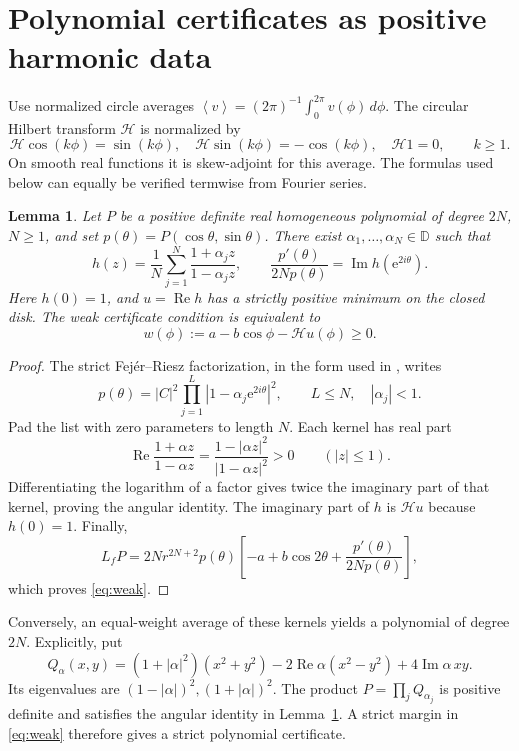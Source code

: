 \documentclass[11pt]{article}
\newtheorem{lemma}[theorem]{Lemma}
\theoremstyle{remark}\newtheorem{remark}[theorem]{Remark}
\newcommand{\D}{\mathbb D}
\newcommand{\Rea}{\operatorname{Re}}
\newcommand{\Ima}{\operatorname{Im}}
\newcommand{\avg}[1]{\left\langle #1\right\rangle}
\newcommand{\ee}{\mathrm e}
\begin{document}
\section{Polynomial certificates as positive harmonic data}
Use normalized circle averages
\(\avg v=(2\pi)^{-1}\int_0^{2\pi}v(\phi)\,d\phi\).
The circular Hilbert transform \(\mathcal H\) is normalized by
\[
 \mathcal H\cos(k\phi)=\sin(k\phi),\quad
 \mathcal H\sin(k\phi)=-\cos(k\phi),\quad
 \mathcal H1=0,\qquad k\ge1.
\]
On smooth real functions it is skew-adjoint for this average.
The formulas used below can equally be verified termwise from
Fourier series.

\begin{lemma}\label{lem:harmonic}
Let \(P\) be a positive definite real homogeneous polynomial of
degree \(2N\), \(N\ge1\), and set
\(p(\theta)=P(\cos\theta,\sin\theta)\).
There exist \(\alpha_1,\ldots,\alpha_N\in\D\) such that
\[
 h(z)=\frac1N\sum_{j=1}^N\frac{1+\alpha_jz}{1-\alpha_jz},
 \qquad
 \frac{p'(\theta)}{2Np(\theta)}
       =\Ima h(\ee^{2i\theta}).
\]
Here \(h(0)=1\), and \(u=\Rea h\) has a strictly positive minimum
on the closed disk. The weak certificate condition is equivalent to
\begin{equation}\label{eq:weak}
 w(\phi):=a-b\cos\phi-\mathcal Hu(\phi)\ge0.
\end{equation}
\end{lemma}
\begin{proof}
The strict Fej\'er--Riesz factorization, in the form used in
\cite[Lemmas III.2--III.3]{liu}, writes
\[
 p(\theta)=|C|^2\prod_{j=1}^L
        |1-\alpha_j\ee^{2i\theta}|^2,
 \qquad L\le N,\quad |\alpha_j|<1.
\]
Pad the list with zero parameters to length \(N\).
Each kernel has real part
\[
 \Rea\frac{1+\alpha z}{1-\alpha z}
       =\frac{1-|\alpha z|^2}{|1-\alpha z|^2}>0
       \qquad(|z|\le1).
\]
Differentiating the logarithm of a factor gives twice the imaginary
part of that kernel, proving the angular identity.
The imaginary part of \(h\) is \(\mathcal Hu\) because \(h(0)=1\).
Finally,
\[
 L_fP=2N r^{2N+2}p(\theta)
       \left[-a+b\cos2\theta+
              \frac{p'(\theta)}{2Np(\theta)}\right],
\]
which proves \eqref{eq:weak}.
\end{proof}

Conversely, an equal-weight average of these kernels yields a
polynomial of degree \(2N\). Explicitly, put
\begin{equation}\label{eq:quadratic}
 Q_\alpha(x,y)=(1+|\alpha|^2)(x^2+y^2)
       -2\Rea\alpha(x^2-y^2)+4\Ima\alpha\,xy.
\end{equation}
Its eigenvalues are \((1-|\alpha|)^2,(1+|\alpha|)^2\).
The product \(P=\prod_jQ_{\alpha_j}\) is positive definite and
satisfies the angular identity in Lemma~\ref{lem:harmonic}.
A strict margin in \eqref{eq:weak} therefore gives a strict
polynomial certificate.
\end{document}
